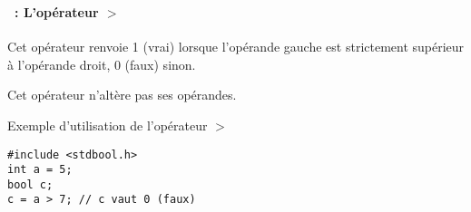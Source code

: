 \begin{frame}[containsverbatim]
  \frametitle{\secname}
  \framesubtitle{\subsecname~: L'opérateur $>$} 

  Cet opérateur renvoie 1 (vrai) lorsque l'opérande gauche est strictement supérieur à l'opérande droit, 0 (faux) sinon. 
  \par
  Cet opérateur n'altère pas ses opérandes.
  \vspace{0.3cm}
  \begin{exampleblock}{Exemple d'utilisation de l'opérateur $>$}
    \begin{verbatim}
#include <stdbool.h>
int a = 5;
bool c;
c = a > 7; // c vaut 0 (faux)\end{verbatim}
  \end{exampleblock}

\end{frame}


